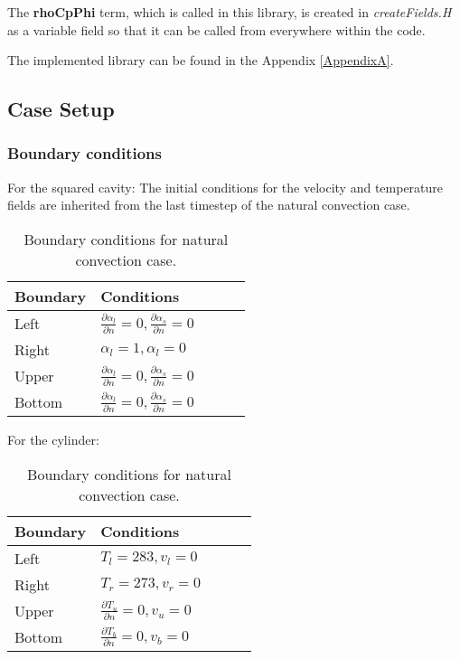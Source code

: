 The \textbf{rhoCpPhi} term, which is called in this library, is created in \textit{createFields.H} as a variable field so that it can be called from everywhere within the code.
 
The implemented library can be found in the Appendix \ref{AppendixA}. 

\subsection{Case Setup}
\subsubsection*{Boundary conditions}

For the squared cavity:
The initial conditions for the velocity and temperature fields are inherited from the last timestep of the natural convection case.
\begin{table}[h!]
	\begin{tabular}{@{}lllll@{}}
		\toprule[1pt]
		\textbf{Boundary} & \textbf{Conditions}  \\ \midrule[2pt]
		Left & $\frac{\partial \alpha_{l}}{\partial n} = 0, \frac{\partial \alpha_{s}}{\partial n} = 0    $  \\
		Right & $\alpha_{l} = 1, \alpha_{l} = 0 $ \\
		Upper & $\frac{\partial \alpha_{l}}{\partial n} = 0, \frac{\partial \alpha_{s}}{\partial n} = 0$  \\
		Bottom & $\frac{\partial \alpha_{l}}{\partial n} = 0, \frac{\partial \alpha_{s}}{\partial n} = 0 $  \\ \bottomrule[1pt]		
	\end{tabular}
	\centering
	\caption{Boundary conditions for natural convection case.}	
	\label{fig:boundaryCdsCavity}
\end{table}

For the cylinder:
\begin{table}[h!]
	\begin{tabular}{@{}lllll@{}}
		\toprule[1pt]
		\textbf{Boundary} & \textbf{Conditions}  \\ \midrule[2pt]
		Left & $T_{l}=283, v_{l} = 0   $  \\
		Right & $T_{r}=273, v_{r} = 0 $ \\
		Upper & $\frac{\partial T_{u}}{\partial n} = 0, v_{u} = 0$  \\
		Bottom & $\frac{\partial T_{b}}{\partial n} = 0, v_{b} = 0$  \\ \bottomrule[1pt]		
	\end{tabular}
	\centering
	\caption{Boundary conditions for natural convection case.}	
	\label{fig:boundaryCdsCylinder}
\end{table}
